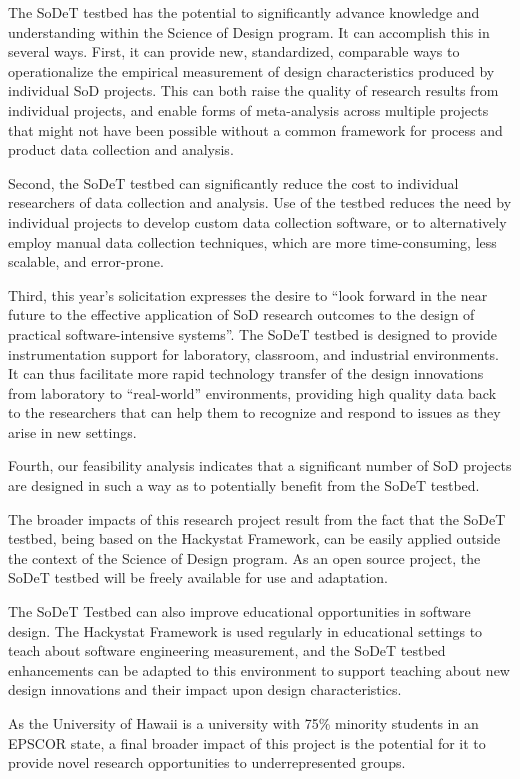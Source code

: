 The SoDeT testbed has the potential to significantly advance knowledge and
understanding within the Science of Design program.  It can accomplish this
in several ways. First, it can provide new, standardized, comparable ways
to operationalize the empirical measurement of design characteristics
produced by individual SoD projects.  This can both raise the quality of
research results from individual projects, and enable forms of
meta-analysis across multiple projects that might not have been possible
without a common framework for process and product data collection and
analysis.

Second, the SoDeT testbed can significantly reduce the cost to individual
researchers of data collection and analysis. Use of the testbed reduces the
need by individual projects to develop custom data collection software, or
to alternatively employ manual data collection techniques, which are more
time-consuming, less scalable, and error-prone.

Third, this year's solicitation expresses the desire to ``look forward in
the near future to the effective application of SoD research outcomes to
the design of practical software-intensive systems''.  The SoDeT testbed is
designed to provide instrumentation support for laboratory, classroom, and
industrial environments.  It can thus facilitate more rapid technology
transfer of the design innovations from laboratory to ``real-world''
environments, providing high quality data back to the researchers that can
help them to recognize and respond to issues as they arise in new settings.

Fourth, our feasibility analysis indicates that a significant number of SoD
projects are designed in such a way as to potentially benefit from the SoDeT 
testbed.  

The broader impacts of this research project result from the fact that the
SoDeT testbed, being based on the Hackystat Framework, can be easily
applied outside the context of the Science of Design program. As an open
source project, the SoDeT testbed will be freely available for use and
adaptation.  

The SoDeT Testbed can also improve educational opportunities in software
design.  The Hackystat Framework is used regularly in educational settings
to teach about software engineering measurement, and the SoDeT testbed
enhancements can be adapted to this environment to support teaching about
new design innovations and their impact upon design characteristics.

As the University of Hawaii is a university with 75\% minority students in
an EPSCOR state, a final broader impact of this project is the potential
for it to provide novel research opportunities to underrepresented groups.

